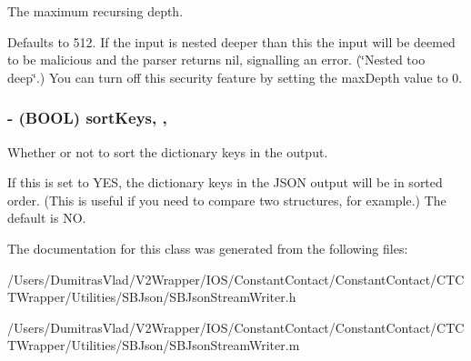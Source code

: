 The maximum recursing depth. 

Defaults to 512. If the input is nested deeper than this the input will be deemed to be malicious and the parser returns nil, signalling an error. (\char`\"{}\-Nested too deep\char`\"{}.) You can turn off this security feature by setting the max\-Depth value to 0. \hypertarget{interface_s_b_json_stream_writer_ab206c6844a0fd20307b5dfe881e17bf2}{
\subsubsection[{sort\-Keys}]{\setlength{\rightskip}{0pt plus 5cm}-\/ (B\-O\-O\-L) sort\-Keys\hspace{0.3cm}{\ttfamily [read]}, {\ttfamily [write]}, {\ttfamily [atomic]}}}\label{interface_s_b_json_stream_writer_ab206c6844a0fd20307b5dfe881e17bf2}


Whether or not to sort the dictionary keys in the output. 

If this is set to Y\-E\-S, the dictionary keys in the J\-S\-O\-N output will be in sorted order. (This is useful if you need to compare two structures, for example.) The default is N\-O. 

The documentation for this class was generated from the following files\-:\begin{DoxyCompactItemize}
\item 
/\-Users/\-Dumitras\-Vlad/\-V2\-Wrapper/\-I\-O\-S/\-Constant\-Contact/\-Constant\-Contact/\-C\-T\-C\-T\-Wrapper/\-Utilities/\-S\-B\-Json/S\-B\-Json\-Stream\-Writer.\-h\item 
/\-Users/\-Dumitras\-Vlad/\-V2\-Wrapper/\-I\-O\-S/\-Constant\-Contact/\-Constant\-Contact/\-C\-T\-C\-T\-Wrapper/\-Utilities/\-S\-B\-Json/S\-B\-Json\-Stream\-Writer.\-m\end{DoxyCompactItemize}

